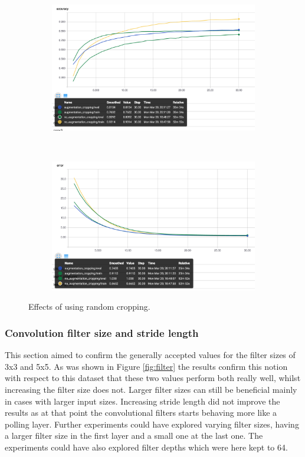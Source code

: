 \documentclass[12pt]{article}
\begin{document}
\begin{figure}[ht!]
    \centering
    \begin{subfigure}[t]{0.475\textwidth}
        \centering
        \includegraphics[width=1.0\linewidth]{disauga.png}
    \end{subfigure}%
    ~ 
    \begin{subfigure}[t]{0.475\textwidth}
        \centering
        \includegraphics[width=1.0\linewidth]{disauge.png}
    \end{subfigure}
    \caption{Effects of using random cropping.}
    \label{fig:augcomp}
\end{figure}

\subsubsection*{Convolution filter size and stride length}

This section aimed to confirm the generally accepted values\cite{kernel}\cite{inspiration}\cite{bestprac} for the filter sizes of 3x3 and 5x5. As was shown in Figure \ref{fig:filter} the results confirm this notion with respect to this dataset that these two values perform both really well, whilst increasing the filter size does not. Larger filter sizes can still be beneficial\cite{alexnet} mainly in cases with larger input sizes. Increasing stride length did not improve the results as at that point the convolutional filters starts behaving more like a polling layer. Further experiments could have explored varying filter sizes, having a larger filter size in the first layer and a small one at the last one. The experiments could have also explored filter depths which were here kept to 64\cite{inspiration}.
\end{document}

